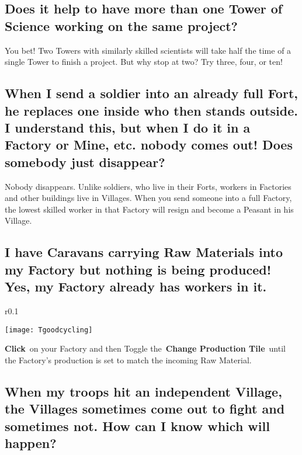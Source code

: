 \subsection{Does it help to have more than one Tower of Science working on the same project?}


You bet! Two Towers with similarly skilled scientists will take half the time of a single Tower to finish a project. But why stop at two? Try three, four, or ten!

\subsection{When I send a soldier into an already full Fort, he replaces one inside who then stands outside. I understand this, but when I do it in a Factory or Mine, etc. nobody comes out! Does somebody just disappear?}

Nobody disappears. Unlike soldiers, who live in their Forts, workers in Factories and other buildings live in Villages. When you send someone into a full Factory, the lowest skilled worker in that Factory will resign and become a Peasant in his Village.

\subsection{I have Caravans carrying Raw Materials into my Factory but nothing is being produced! Yes, my Factory already has workers in it.}

\begin{wrapfigure}{r}{0.1\textwidth}
	\vspace{-20pt}
	\begin{center}
		\texttt{[image: Tgoodcycling]}
	\end{center}
	\vspace{-20pt}
\end{wrapfigure}

\textbf{Click} on your Factory and then Toggle the \textbf{Change Production Tile} until the Factory’s production is set to match the incoming Raw Material.

\subsection{When my troops hit an independent Village, the Villages sometimes come out to fight and sometimes not. How can I know which will happen?}

